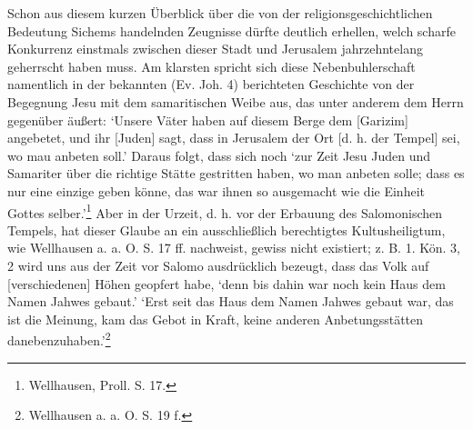 \documentclass[a4paper, 11pt, oneside]{article}
\begin{document}
Schon aus diesem kurzen Überblick über die von der religionsgeschichtlichen Bedeutung Sichems handelnden Zeugnisse dürfte deutlich erhellen, welch scharfe Konkurrenz einstmals zwischen dieser Stadt und Jerusalem jahrzehntelang geherrscht haben muss. Am klarsten spricht sich diese Nebenbuhlerschaft namentlich in der bekannten (Ev. Joh. 4) berichteten Geschichte von der Begegnung Jesu mit dem samaritischen Weibe aus, das unter anderem dem Herrn gegenüber äußert: `Unsere Väter haben auf diesem Berge dem [Garizim] angebetet, und ihr [Juden] sagt, dass in Jerusalem der Ort [d. h. der Tempel] sei, wo mau anbeten soll.' Daraus folgt, dass sich noch `zur Zeit Jesu Juden und Samariter über die richtige Stätte gestritten haben, wo man anbeten solle; dass es nur eine einzige geben könne, das war ihnen so ausgemacht wie die Einheit Gottes selber.'\footnote{Wellhausen, Proll. S. 17.} Aber in der Urzeit, d. h. vor der Erbauung des Salomonischen Tempels, hat dieser Glaube an ein ausschließlich berechtigtes Kultusheiligtum, wie Wellhausen a. a. O. S. 17 ff. nachweist, gewiss nicht existiert; z. B. 1. Kön. 3, 2 wird uns aus der Zeit vor Salomo ausdrücklich bezeugt, dass das Volk auf [verschiedenen] Höhen geopfert habe, `denn bis dahin war noch kein Haus dem Namen Jahwes gebaut.' `Erst seit das Haus dem Namen Jahwes gebaut war, das ist die Meinung, kam das Gebot in Kraft, keine anderen Anbetungsstätten danebenzuhaben.'\footnote{Wellhausen a. a. O. S. 19 f.}
\end{document}
